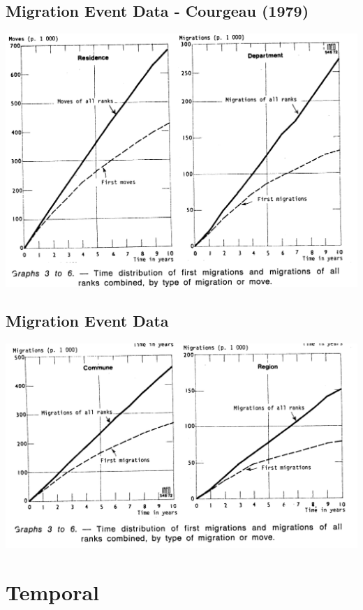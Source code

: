 \documentclass[
]{book}
\begin{document}
\hypertarget{migration-event-data---courgeau-1979}{%
\subsection{Migration Event Data - Courgeau (1979)}\label{migration-event-data---courgeau-1979}}

\includegraphics[width=0.9\linewidth]{img/courgeau-1979-period-a}

\hypertarget{migration-event-data-2}{%
\subsection{Migration Event Data}\label{migration-event-data-2}}

\includegraphics[width=0.9\linewidth]{img/courgeau-1979-period-b}

\hypertarget{temporal}{%
\section{Temporal}\label{temporal}}
\end{document}
